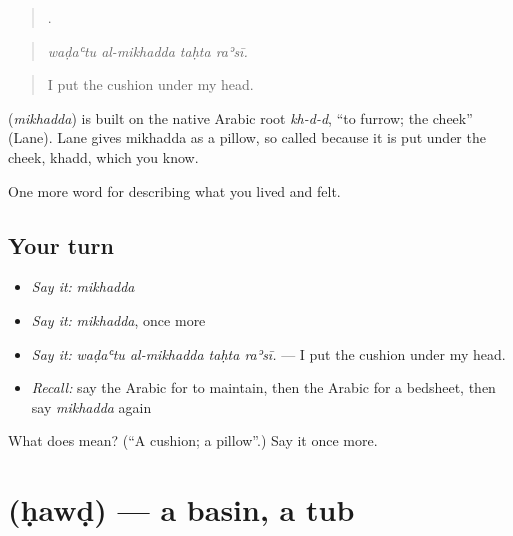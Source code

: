\begin{quote}
   .
\end{quote}

\begin{quote}
\emph{waḍaʿtu al-mikhadda taḥta raʾsī.}
\end{quote}

\begin{quote}
I put the cushion under my head.
\end{quote}

\begin{cousinweb}
\textbf{} (\emph{mikhadda}) is built on the native Arabic root \emph{kh-d-d}, \textquotedblleft{}to furrow; the cheek\textquotedblright{} (Lane). Lane gives mikhadda as a pillow, so called because it is put under the cheek, khadd, which you know.
\end{cousinweb}

\begin{grammarlens}[title={What you've built}]
One more word for describing what you lived and felt.
\end{grammarlens}

\subsection*{Your turn}
\begin{itemize}
\raggedright
  \item \emph{Say it:} \emph{mikhadda}
  \item \emph{Say it:} \emph{mikhadda}, once more
  \item \emph{Say it:} \emph{waḍaʿtu al-mikhadda taḥta raʾsī.} — I put the cushion under my head.
  \item \emph{Recall:} say the Arabic for to maintain, then the Arabic for a bedsheet, then say \emph{mikhadda} again
\end{itemize}

\begin{tcolorbox}[breakable,colback=teal!4,colframe=teal!35!black,title={Before you move on}]
What does  mean? (\textquotedblleft{}A cushion; a pillow\textquotedblright{}.) Say it once more.
\end{tcolorbox}
\section[\texorpdfstring{\ar{حوض} (ḥawḍ)}{حوض (ḥawḍ)}]{ (ḥawḍ) — a basin, a tub}

